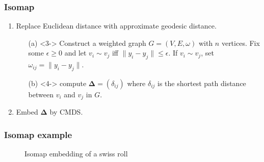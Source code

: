 \documentclass[professionalfonts,hyperref={pdfpagelabels=false,colorlinks=true,linkcolor=red}]{beamer}
\begin{document}
\begin{frame}
  \frametitle{Isomap} 
  \begin{enumerate}
  \item<2-> Replace Euclidean distance with approximate geodesic
    distance.
    \begin{enumerate}
    \item[(a)]<3-> Construct a weighted graph $G = (V,E,\omega)$ with $n$
      vertices. Fix some $\epsilon \geq 0$ and let $v_i \sim v_j$ iff
      $\|y_i - y_j\| \leq \epsilon$. If $v_i \sim v_j$, set
      $\omega_{ij} = \|y_i - y_j\|$.
    \item[(b)]<4-> compute $\bm{\Delta} = (\delta_{ij})$ where
      $\delta_{ij}$ is the shortest path distance between $v_i$ and
      $v_j$ in $G$.
    \end{enumerate}
   \item<5-> Embed $\bm{\Delta}$ by CMDS.
  \end{enumerate}
\end{frame}
\begin{frame}[label=isomap_example]
  \frametitle{Isomap example}
  \subfiglabelskip=0pt
  \begin{figure}[htbp]
    \label{fig:swissroll}
    \centering
    \hspace{3pt}
    \caption{Isomap embedding of a swiss roll}
  \end{figure}
\end{frame}
\end{document}
